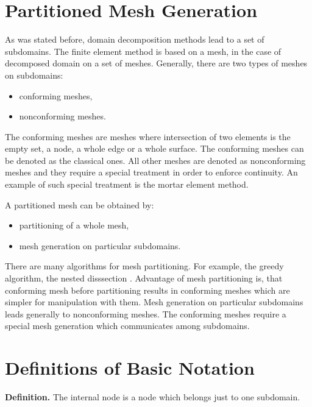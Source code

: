 \section{Partitioned Mesh Generation}

As was stated before, domain decomposition methods lead to a set of subdomains.
The finite element method is based on a mesh, in the case of decomposed domain
on a set of meshes. Generally, there are two types of meshes on subdomains:
\begin{itemize}
\item conforming meshes,
\item nonconforming meshes.
\end{itemize}

The conforming meshes are meshes where intersection of two elements is the empty set,
a node, a whole edge or a whole surface. The conforming meshes can be denoted as the
classical ones. All other meshes are denoted as nonconforming meshes and they require
a special treatment in order to enforce continuity. An example of such special treatment
is the mortar element  method.

A partitioned mesh can be obtained by:
\begin{itemize}
\item partitioning of a whole mesh,
\item mesh generation on particular subdomains.
\end{itemize}
There are many algorithms for  mesh partitioning. For
example, the greedy  algorithm,
the nested  disssection \cite{Meurant}.
Advantage of mesh partitioning is, that conforming mesh before partitioning results
in conforming meshes which are simpler for manipulation with them. Mesh generation
on particular subdomains leads generally to nonconforming meshes. The conforming
meshes require a special mesh generation which communicates among subdomains.

\section{Definitions of Basic Notation}

\noindent
{\bf Definition.}
The internal node  is a node which belongs just to one subdomain.

